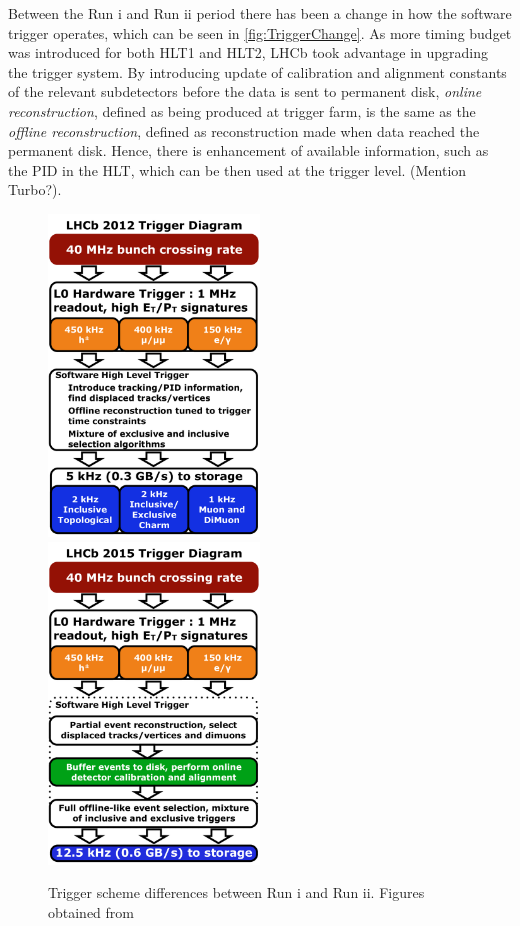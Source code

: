 Between the Run \Rn{1} and Run \Rn{2} period there has been a change in how the software trigger operates, which can be seen in \autoref{fig:TriggerChange}. As more timing budget was introduced for both \Gls{HLT1} and \Gls{HLT2}, \Gls{LHCb} took advantage in upgrading the trigger system. By introducing update of calibration and alignment constants of the relevant subdetectors before the data is sent to permanent disk, \textit{online reconstruction}, defined as being produced at trigger farm, is the same as the \textit{offline reconstruction}, defined as reconstruction made when data reached the permanent disk. Hence, there is enhancement of available information, such as the \Gls{PID} in the \Gls{HLT}, which can be then used at the trigger level. 
(Mention Turbo?).


\begin{figure}[!h]
	\centering
	\includegraphics[width = 0.5\textwidth]{figs/detector/LHCb_Trigger_RunIAlg.pdf}%
	\includegraphics[width = 0.5\textwidth]{figs/detector/LHCb_Trigger_RunII.pdf}%
	\caption{Trigger scheme differences between Run \Rn{1} and Run \Rn{2}. Figures obtained from \cite{triggerscheme}}  
	\label{fig:TriggerChange}
\end{figure}


